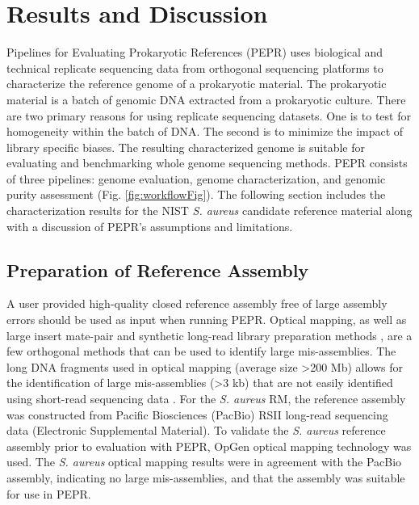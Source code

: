 \documentclass[smallextended]{svjour3}\usepackage[]{graphicx}\usepackage[]{color}
\begin{document}
\section{Results and Discussion}
Pipelines for Evaluating Prokaryotic References (PEPR) uses biological and technical replicate sequencing data from orthogonal sequencing platforms to characterize the reference genome of a prokaryotic material. 
The prokaryotic material is a batch of genomic DNA extracted from a prokaryotic culture. 
There are two primary reasons for using replicate sequencing datasets. 
One is to test for homogeneity within the batch of DNA. 
The second is to minimize the impact of library specific biases. 
The resulting characterized genome is suitable for evaluating and benchmarking whole genome sequencing methods. 
PEPR consists of three pipelines: genome evaluation, genome characterization, and genomic purity assessment (Fig. \ref{fig:workflowFig}). 
The following section includes the characterization results for the NIST \textit{S. aureus} candidate reference material along with a discussion of PEPR's assumptions and limitations. 


\subsection{Preparation of Reference Assembly} 
A user provided high-quality closed reference assembly free of large assembly errors should be used as input when running PEPR. 
Optical mapping, as well as large insert mate-pair and synthetic long-read library preparation methods \cite{McCoy2014}, are a few orthogonal methods that can be used to identify large mis-assemblies. 
The long DNA fragments used in optical mapping (average size \textgreater 200 Mb) allows for the identification of large mis-assemblies (\textgreater 3 kb) that are not easily identified using short-read sequencing data \cite{Mendelowitz2014}. 
For the \textit{S. aureus} RM, the reference assembly was constructed from Pacific Biosciences (PacBio) RSII long-read sequencing data (Electronic Supplemental Material).
To validate the \textit{S. aureus} reference assembly prior to evaluation with PEPR, OpGen optical mapping technology was used. 
The \textit{S. aureus} optical mapping results were in agreement with the  PacBio assembly, indicating no large mis-assemblies, and that the assembly was suitable for use in PEPR. 
\end{document}
